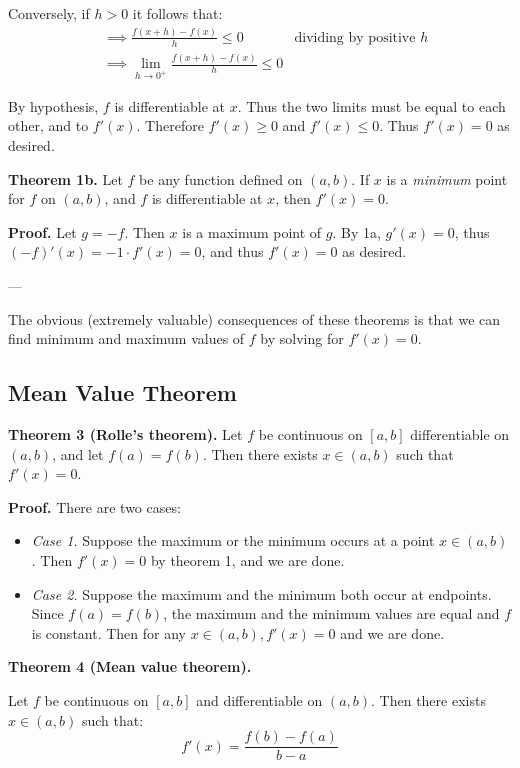 Conversely, if $h>0$ it follows that:
\begin{align*}
  &\implies \frac{f(x+h)-f(x)}{h}\leq0&\text{dividing by positive $h$}\\
  &\implies \lim_{h\to0^+}\frac{f(x+h)-f(x)}{h}\leq0
\end{align*}

By hypothesis, $f$ is differentiable at $x$. Thus the two limits must
be equal to each other, and to $f'(x)$. Therefore $f'(x)\geq0$ and
$f'(x)\leq0$. Thus $f'(x)=0$ as desired.

\vs

\textbf{Theorem 1b.} Let $f$ be any function defined on $(a,b)$. If
$x$ is a \textit{minimum} point for $f$ on $(a,b)$, and $f$ is
differentiable at $x$, then $f'(x)=0$.

\vs

\textbf{Proof.} Let $g=-f$. Then $x$ is a maximum point of $g$. By 1a,
$g'(x)=0$, thus $(-f)'(x)=-1\cdot f'(x)=0$, and thus $f'(x)=0$ as desired.

\vs---\vs

The obvious (extremely valuable) consequences of these theorems is
that we can find minimum and maximum values of $f$ by solving for
$f'(x)=0$.

\subsection{Mean Value Theorem}

\textbf{Theorem 3 (Rolle's theorem).} Let $f$ be continuous on $[a,b]$
differentiable on $(a,b)$, and let $f(a)=f(b)$. Then there exists
$x\in(a,b)$ such that $f'(x)=0$.

\vs

\textbf{Proof.} There are two cases:
\begin{itemize}
\item \textit{Case 1.} Suppose the maximum or the minimum occurs at a
  point $x\in(a,b)$. Then $f'(x)=0$ by theorem 1, and we are done.
\item \textit{Case 2.} Suppose the maximum and the minimum both occur
  at endpoints. Since $f(a)=f(b)$, the maximum and the minimum values
  are equal and $f$ is constant. Then for any $x\in(a,b), f'(x)=0$ and
  we are done.
\end{itemize}

\textbf{Theorem 4 (Mean value theorem).}

Let $f$ be continuous on $[a,b]$ and differentiable on $(a,b)$. Then
there exists $x\in(a,b)$ such that:
\[f'(x)=\frac{f(b)-f(a)}{b-a}\]

